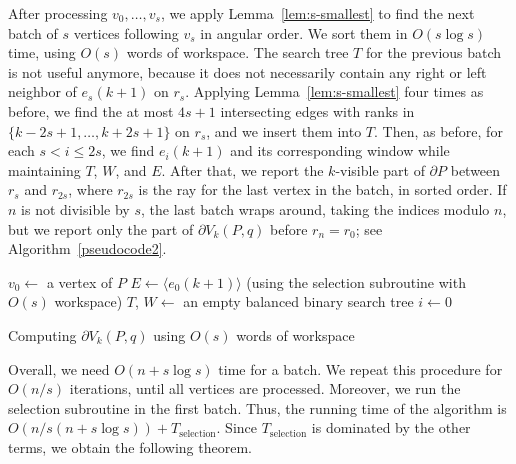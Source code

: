 \documentclass[11pt, a4paper]{article}
\newenvironment{alg}{
  \begin{algorithm}[htbp]
    \DontPrintSemicolon
    \SetKwInput{KwIn}{input}
    \SetKwInput{KwOut}{output}
  }{\end{algorithm}}
\begin{document}
After processing $v_0, \dots, v_s$, we apply 
Lemma~\ref{lem:s-smallest} to find the next batch of $s$ 
vertices following $v_s$ in angular order. We sort them in 
$O(s\log s)$ time, using $O(s)$ words of workspace. The search tree 
$T$ for the previous
batch is not useful anymore, because it does not necessarily contain 
any right or left neighbor of $e_{s}(k+1)$ on $r_s$. Applying 
Lemma~\ref{lem:s-smallest} four times as before, we find the at most 
$4s + 1$ intersecting edges with ranks in $\{k - 2s + 1, \dots, k + 2s + 1\}$
on $r_s$, and we insert them into $T$. 
Then, as before, for each $s < i \leq 2s $, we find $e_i(k+1)$ and 
its corresponding window while maintaining $T$, $W$, and $E$. 
After that, we report the $k$-visible part of $\partial P$ between
$r_s$ and $r_{2s}$, where $r_{2s}$ is the ray for the last vertex 
in the batch, in sorted order. If $n$ is not divisible by $s$,
the last batch wraps around, taking the indices modulo $n$, 
but we report only the part of $\partial V_k(P,q)$ before $r_n = r_0$; 
see Algorithm~\ref{pseudocode2}. 

\begin{alg}
 $v_0 \gets$ a vertex of $P$\;
 $E \gets  \langle e_0(k+1) \rangle$ (using the selection subroutine with $O(s)$ workspace)\;
 $T$, $W \gets$ an empty balanced binary search tree\;
 $i\gets 0$\;
 
 \caption{Computing $\partial V_k(P,q)$ using $O(s)$ words of workspace}\label{pseudocode2}
\end{alg}


Overall, we need $O(n + s\log s)$ time for a batch. 
We repeat this procedure for $O(n/s)$ iterations, until all 
vertices are processed. 
Moreover, we run the selection subroutine in the first batch. 
Thus, the running time of the algorithm is 
$O(n/s(n+s\log{s}))+T_\text{selection}$. Since $T_\text{selection}$ 
is dominated by the other terms, we obtain the following theorem.
\end{document}
